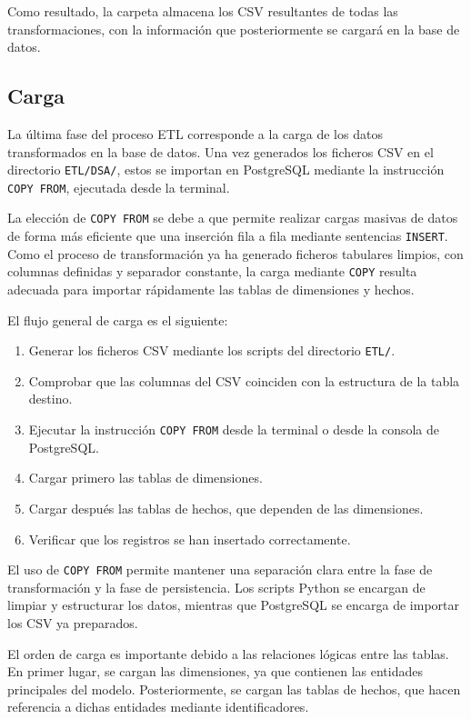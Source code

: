 Como resultado, la carpeta  almacena los CSV resultantes de todas las transformaciones, con la información que posteriormente se cargará en la base de datos.

\subsection{Carga}

La última fase del proceso ETL corresponde a la carga de los datos transformados en la base de datos. Una vez generados los ficheros CSV en el directorio \texttt{ETL/DSA/}, estos se importan en PostgreSQL mediante la instrucción \texttt{COPY FROM}, ejecutada desde la terminal.

La elección de \texttt{COPY FROM} se debe a que permite realizar cargas masivas de datos de forma más eficiente que una inserción fila a fila mediante sentencias \texttt{INSERT}. Como el proceso de transformación ya ha generado ficheros tabulares limpios, con columnas definidas y separador constante, la carga mediante \texttt{COPY} resulta adecuada para importar rápidamente las tablas de dimensiones y hechos.

El flujo general de carga es el siguiente:

\begin{enumerate}
    \item Generar los ficheros CSV mediante los scripts del directorio \texttt{ETL/}.
    \item Comprobar que las columnas del CSV coinciden con la estructura de la tabla destino.
    \item Ejecutar la instrucción \texttt{COPY FROM} desde la terminal o desde la consola de PostgreSQL.
    \item Cargar primero las tablas de dimensiones.
    \item Cargar después las tablas de hechos, que dependen de las dimensiones.
    \item Verificar que los registros se han insertado correctamente.
\end{enumerate}

El uso de \texttt{COPY FROM} permite mantener una separación clara entre la fase de transformación y la fase de persistencia. Los scripts Python se encargan de limpiar y estructurar los datos, mientras que PostgreSQL se encarga de importar los CSV ya preparados.

El orden de carga es importante debido a las relaciones lógicas entre las tablas. En primer lugar, se cargan las dimensiones, ya que contienen las entidades principales del modelo. Posteriormente, se cargan las tablas de hechos, que hacen referencia a dichas entidades mediante identificadores.

